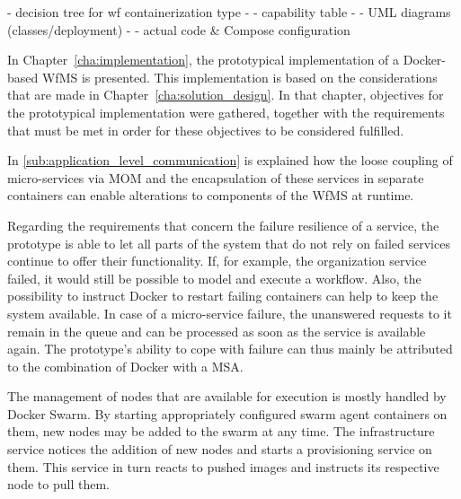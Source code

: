
  - decision tree for wf containerization type -
  - capability table -
  - UML diagrams (classes/deployment) -
  - actual code \& Compose configuration


  In Chapter~\ref{cha:implementation}, the prototypical implementation of a Docker-based \ac{WfMS} is presented. This implementation is based on the considerations that are made in Chapter~\ref{cha:solution_design}. In that chapter, objectives for the prototypical implementation were gathered, together with the requirements that must be met in order for these objectives to be considered fulfilled.


  In \ref{sub:application_level_communication} is explained how the loose coupling of micro-services via \ac{MOM} and the encapsulation of these services in separate containers can enable alterations to components of the \ac{WfMS} at runtime.

  Regarding the requirements that concern the failure resilience of a service, the prototype is able to let all parts of the system that do not rely on failed services continue to offer their functionality. If, for example, the organization service failed, it would still be possible to model and execute a workflow. Also, the possibility to instruct Docker to restart failing containers can help to keep the system available. In case of a micro-service failure, the unanswered requests to it remain in the queue and can be processed as soon as the service is available again. The prototype's ability to cope with failure can thus mainly be attributed to the combination of Docker with a \ac{MSA}.

  The management of nodes that are available for execution is mostly handled by Docker Swarm. By starting appropriately configured swarm agent containers on them, new nodes may be added to the swarm at any time. The infrastructure service notices the addition of new nodes and starts a provisioning service on them. This service in turn reacts to pushed images and instructs its respective node to pull them.

